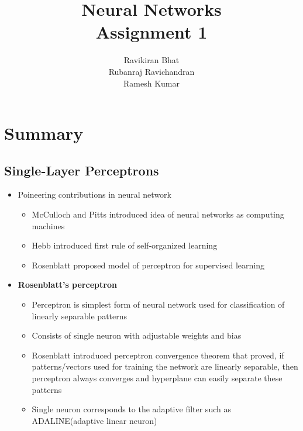 \documentclass[12pt]{article}
\title{\Huge Neural Networks \\
[6mm]
Assignment 1\\}
\author{Ravikiran Bhat\\
Rubanraj Ravichandran\\
Ramesh Kumar}
\begin{document}
\maketitle
\newpage
\section{Summary}
 
\subsection{Single-Layer Perceptrons}

\begin{itemize}
	\item Poineering contributions in neural network
		\begin{itemize}
			\item McCulloch and Pitts introduced idea of neural networks as computing machines
			\item Hebb introduced first rule of self-organized learning
			\item Rosenblatt proposed model of perceptron for supervised learning
		\end{itemize}
	\item  \textbf{Rosenblatt's perceptron}
		\begin{itemize}
			\item Perceptron is simplest form of neural network used for classification of linearly separable patterns
			\item Consists of single neuron with adjustable weights and bias
			\item Rosenblatt introduced perceptron convergence theorem that proved, if patterns/vectors used for training the network are linearly separable, then perceptron always converges and hyperplane can easily separate these patterns
			\item Single neuron corresponds to the adaptive filter such as ADALINE(adaptive linear neuron)
		\end{itemize}
\end{itemize}
\end{document}
